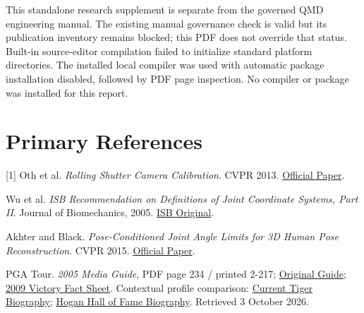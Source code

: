 \documentclass[11pt,a4paper]{article}
\begin{document}
This standalone research supplement is separate from the governed QMD engineering manual. The existing manual governance check is valid but its publication inventory remains blocked; this PDF does not override that status. Built-in source-editor compilation failed to initialize standard platform directories. The installed local compiler was used with automatic package installation disabled, followed by PDF page inspection. No compiler or package was installed for this report.

\section*{Primary References}
\small
[1] Oth et al. \emph{Rolling Shutter Camera Calibration}. CVPR 2013. \href{https://www.cv-foundation.org/openaccess/content_cvpr_2013/html/Oth_Rolling_Shutter_Camera_2013_CVPR_paper.html}{Official Paper}.\par
[2] Wu et al. \emph{ISB Recommendation on Definitions of Joint Coordinate Systems, Part II}. Journal of Biomechanics, 2005. \href{https://media.isbweb.org/images/documents/standards/isb_jcs_part_ii.pdf}{ISB Original}.\par
[3] Akhter and Black. \emph{Pose-Conditioned Joint Angle Limits for 3D Human Pose Reconstruction}. CVPR 2015. \href{https://openaccess.thecvf.com/content_cvpr_2015/html/Akhter_Pose-Conditioned_Joint_Angle_2015_CVPR_paper.html}{Official Paper}.\par
[4] PGA Tour. \emph{2005 Media Guide}, PDF page 234 / printed 2-217; \href{https://pgatourmedia.pgatourhq.com/static-assets/page/header/files/2005_pgatour.pdf}{Original Guide}; \href{https://pgatourmedia.pgatourhq.com/static-assets/page/files/tours/2009/pgatour/arnoldpalmerinvitationalpresentedbymastercard/gCAAFactsSheet/wtv-woods-p.pdf}{2009 Victory Fact Sheet}. Contextual profile comparison: \href{https://www.pgatour.com/player/08793/tiger-woods/bio}{Current Tiger Biography}; \href{https://worldgolfhalloffame.org/members/ben-hogan.html}{Hogan Hall of Fame Biography}. Retrieved 3 October 2026.\par
\end{document}

